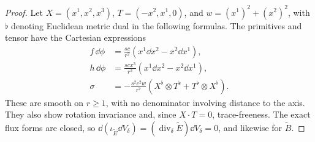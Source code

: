 \begin{proof}
Let $X=(x^1,x^2,x^3)$, $T=(-x^2,x^1,0)$, and
$w=(x^1)^2+(x^2)^2$, with $\flat$ denoting Euclidean metric dual in the
following formulas.  The primitives and tensor have the Cartesian expressions
\begin{equation}
\label{eq:cartesian-seeds}
\begin{aligned}
 f\,\dd\phi&=\frac{sc}{r^2}(x^1\dd x^2-x^2\dd x^1),\\
 h\,\dd\phi&=\frac{scx^3}{r^3}(x^1\dd x^2-x^2\dd x^1),\\
 \sigma&=-\frac{s^2c^2w}{r^7}
   (X^\flat\otimes T^\flat+T^\flat\otimes X^\flat).
\end{aligned}
\end{equation}
These are smooth on $r\ge1$, with no denominator involving distance to
the axis.  They also show rotation invariance and, since $X\cdot T=0$,
trace-freeness.  The exact flux forms are closed, so
$\dd(\iota_{\widetilde E}\dd V_\delta)=
(\operatorname{div}_\delta\widetilde E)\dd V_\delta=0$, and likewise for
$\widetilde B$.


\end{proof}
